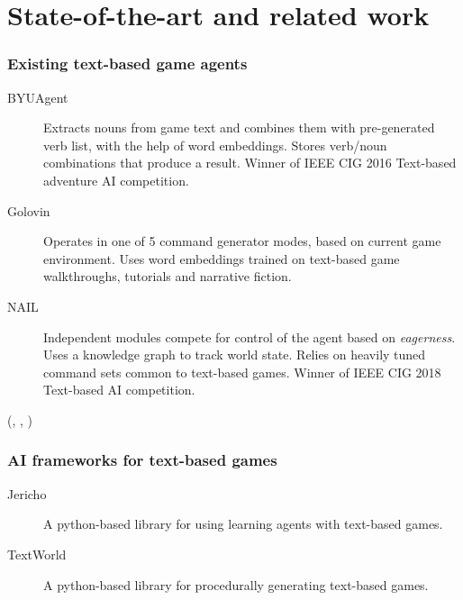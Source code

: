 \section{State-of-the-art and related work}

\begin{frame}

    \frametitle{Existing text-based game agents}
    \begin{description}
        \item[BYUAgent]

            Extracts nouns from game text and combines them with
            pre-generated verb list, with the help of word embeddings.
            Stores verb/noun combinations that produce a result. Winner
            of IEEE CIG 2016 Text-based adventure AI competition.
        \item[Golovin]

            Operates in one of 5 command generator modes, based on
            current game environment. Uses word embeddings trained
            on text-based game walkthroughs, tutorials and narrative
            fiction.
        \item[NAIL]

            Independent modules compete for control of the agent based
            on \emph{eagerness}. Uses a knowledge graph to track world
            state. Relies on heavily tuned command sets common to
            text-based games. Winner of IEEE CIG 2018 Text-based AI
            competition.
    \end{description}
    (\cite{atkinson_text-based_2019}, \cite{ricks_byu-agent-2016_2019},
    \cite{hausknecht_nail_2019})

\end{frame}

\begin{frame}
    \frametitle{AI frameworks for text-based games}
    \begin{description}
        \item[Jericho]

            A python-based library for using learning agents with
            text-based games.
            \parencite{hausknecht_interactive_2020}
        \item[TextWorld]
            
            A python-based library for procedurally generating
            text-based games.
            \parencite{cote_textworld_2019}
    \end{description}
\end{frame}
